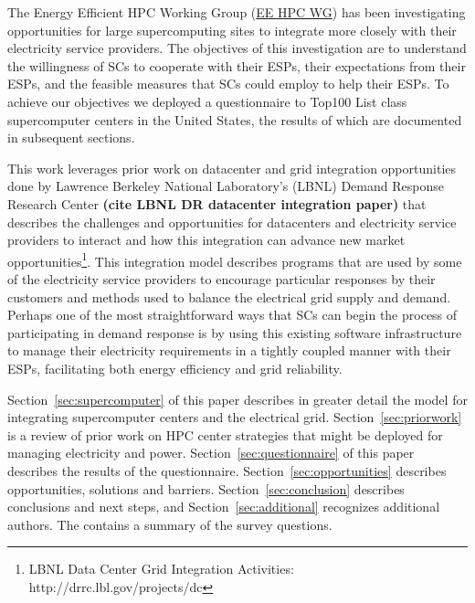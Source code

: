 The Energy Efficient HPC Working Group (\href {http://eehpcwg.lbl.gov/}{EE HPC WG})  
has been investigating opportunities for large supercomputing sites to  
integrate more closely with their electricity service providers.
The objectives of this investigation are to understand the willingness of SCs to
cooperate with their ESPs, their expectations from their ESPs, and the feasible measures
that SCs could employ to help their ESPs.
To achieve our objectives we deployed a questionnaire to
Top100 List class supercomputer centers in the United States, the results of
which are documented in subsequent sections.

This work leverages prior work on datacenter and grid integration opportunities
done by Lawrence Berkeley National Laboratory's (LBNL) Demand Response 
Research Center \textbf{(cite LBNL DR datacenter integration paper)}
that describes the challenges and opportunities for datacenters and electricity
service providers to interact and how this integration can advance 
new market 
opportunities\footnote{LBNL Data Center Grid Integration Activities: http://drrc.lbl.gov/projects/dc}.
This integration model describes programs that are used by some of the electricity 
service providers to encourage particular responses by their customers and methods 
used to balance the electrical grid supply and demand.
Perhaps one of the most straightforward ways that SCs can begin
the process of participating in demand response is by using this existing software 
infrastructure to manage their electricity requirements in a tightly coupled manner 
with their ESPs, facilitating both energy efficiency and grid reliability.

Section~\ref{sec:supercomputer}  of this paper describes in greater detail the model for
integrating supercomputer centers and the electrical grid. Section~\ref{sec:priorwork}
is a review of prior work on HPC center strategies that might be
deployed for managing electricity and power. Section~\ref{sec:questionnaire} of this paper
describes the results of the questionnaire. 
Section~\ref{sec:opportunities} 
describes opportunities, solutions and barriers. Section~\ref{sec:conclusion} describes
conclusions and next steps, and Section~\ref{sec:additional} recognizes additional
authors. The  contains a summary of the survey questions.

